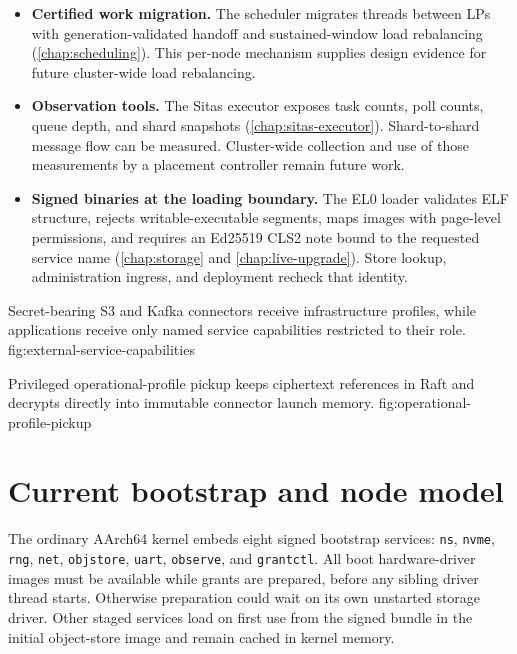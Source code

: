 \begin{itemize}
    \item \textbf{Certified work migration.} The scheduler migrates threads
        between LPs with generation-validated handoff and sustained-window
        load rebalancing (\autoref{chap:scheduling}). This per-node mechanism
        supplies design evidence for future cluster-wide load rebalancing.

    \item \textbf{Observation tools.} The Sitas executor exposes task
        counts, poll counts, queue depth, and shard snapshots
        (\autoref{chap:sitas-executor}).
        Shard-to-shard message flow can be measured. Cluster-wide collection
        and use of those measurements by a placement controller remain
        future work.

    \item \textbf{Signed binaries at the loading boundary.} The EL0 loader
        validates ELF structure, rejects writable-executable segments, maps
        images with page-level permissions, and requires an Ed25519 CLS2 note
        bound to the requested service name (\autoref{chap:storage} and
        \autoref{chap:live-upgrade}). Store
        lookup, administration ingress, and deployment recheck that identity.
\end{itemize}

    {Secret-bearing S3 and Kafka connectors receive infrastructure profiles, while
    applications receive only named service capabilities restricted to their role.}
    {fig:external-service-capabilities}

    {Privileged operational-profile pickup keeps ciphertext references in Raft
    and decrypts directly into immutable connector launch memory.}
    {fig:operational-profile-pickup}

\section{Current bootstrap and node model}

The ordinary AArch64 kernel embeds eight signed bootstrap services:
\texttt{ns}, \texttt{nvme}, \texttt{rng}, \texttt{net}, \texttt{objstore},
\texttt{uart}, \texttt{observe}, and \texttt{grantctl}. All boot hardware-driver
images must be available while grants are prepared, before any sibling driver
thread starts. Otherwise preparation could wait on its own unstarted storage
driver. Other staged services load on first use from the signed bundle in the
initial object-store image and remain cached in kernel memory.

